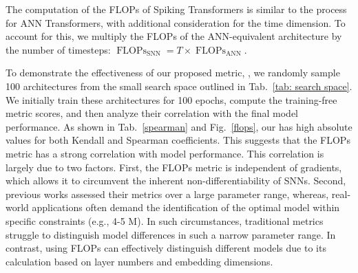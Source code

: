 \documentclass{article}
\theoremstyle{plain}
\theoremstyle{definition}
\theoremstyle{remark}
\begin{document}
The computation of the FLOPs of Spiking Transformers is similar to the process for ANN Transformers, with additional consideration for the time dimension. To account for this, we multiply the FLOPs of the ANN-equivalent architecture by the number of timesteps: $\operatorname{FLOPs}_{\text{SNN}} = T \times \operatorname{FLOPs}_{\text{ANN}}$.

To demonstrate the effectiveness of our proposed metric, \sysname, we randomly sample 100 architectures from the small search space outlined in Tab.~\ref{tab: search space}. We initially train these architectures for 100 epochs, compute the training-free metric scores, and then analyze their correlation with the final model performance. As shown in Tab.~\ref{spearman} and Fig.~\ref{flops}, our \sysname has high absolute values for both Kendall and Spearman coefficients. This suggests that the FLOPs metric has a strong correlation with model performance. This correlation is largely due to two factors. First, the FLOPs metric is independent of gradients, which allows it to circumvent the inherent non-differentiability of SNNs. Second, previous works assessed their metrics over a large parameter range, whereas, real-world applications often demand the identification of the optimal model within specific constraints (e.g., 4-5 M). In such circumstances, traditional metrics struggle to distinguish model differences in such a narrow parameter range. In contrast, \sysname using FLOPs can effectively distinguish different models due to its calculation based on layer numbers and embedding dimensions.




\vskip -0.5in
\end{document}
